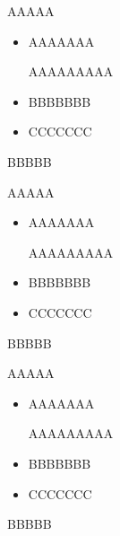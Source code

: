 ﻿\documentclass{article}
\begin{document}
\hrulefill

    AAAAA\par
    \begin{itemize}
        \item AAAAAAA

            AAAAAAAAA
        \item BBBBBBB
        \item CCCCCCC
    \end{itemize}\par
    BBBBB

    AAAAA\par
    \begin{itemize}[noitemsep]
        \item AAAAAAA
        
            AAAAAAAAA
        \item BBBBBBB
        \item CCCCCCC
    \end{itemize}\par
    BBBBB

    AAAAA\par
    \begin{itemize}[nosep]
        \item AAAAAAA

            AAAAAAAAA
        \item BBBBBBB
        \item CCCCCCC
    \end{itemize}\par
    BBBBB


\hrulefill%
\end{document}
